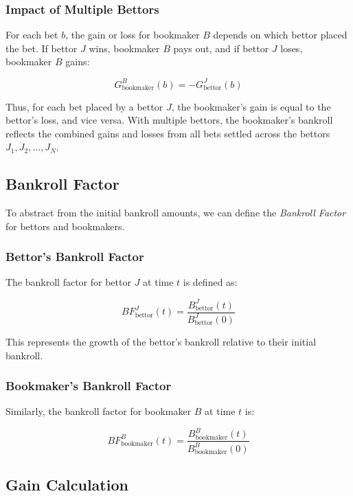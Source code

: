 \subsubsection{Impact of Multiple Bettors}

For each bet \( b \), the gain or loss for bookmaker \( B \) depends on which bettor placed the bet. If bettor \( J \) wins, bookmaker \( B \) pays out, and if bettor \( J \) loses, bookmaker \( B \) gains:

\[
G_{\text{bookmaker}}^B(b) = - G_{\text{bettor}}^J(b)
\]

Thus, for each bet placed by a bettor \( J \), the bookmaker’s gain is equal to the bettor’s loss, and vice versa. With multiple bettors, the bookmaker's bankroll reflects the combined gains and losses from all bets settled across the bettors \( J_1, J_2, \dots, J_N \).


\subsection{Bankroll Factor}

To abstract from the initial bankroll amounts, we can define the \textit{Bankroll Factor} for bettors and bookmakers.

\subsubsection{Bettor's Bankroll Factor}

The bankroll factor for bettor \( J \) at time \( t \) is defined as:

\[
BF_{\text{bettor}}^J(t) = \frac{B_{\text{bettor}}^J(t)}{B_{\text{bettor}}^J(0)}
\]

This represents the growth of the bettor's bankroll relative to their initial bankroll.

\subsubsection{Bookmaker's Bankroll Factor}

Similarly, the bankroll factor for bookmaker \( B \) at time \( t \) is:

\[
BF_{\text{bookmaker}}^B(t) = \frac{B_{\text{bookmaker}}^B(t)}{B_{\text{bookmaker}}^B(0)}
\]

\subsection{Gain Calculation}

